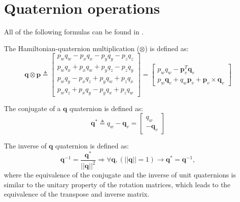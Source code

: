 \appendix
\chapter{Quaternion operations}\label{app:quaternion}

All of the following formulas can be found in \cite{quaternion-eskf}. 

The Hamiltonian-quaternion multiplication ($\otimes$) is defined as:
\begin{equation}
    \mathbf{q}\otimes\mathbf{p}\triangleq
    \begin{bmatrix}
        p_wq_w-p_xq_x-p_yq_y-p_zq_z \\
        p_wq_x+p_xq_w+p_yq_z-p_zq_y \\
        p_wq_y-p_xq_z+p_yq_w+p_zq_x \\
        p_wq_z+p_xq_y-p_yq_x+p_zq_w
    \end{bmatrix}=\begin{bmatrix}
        p_wq_w-\mathbf{p}_v^T\mathbf{q}_v \\
        p_w\mathbf{q}_v+q_w\mathbf{p}_v+\mathbf{p}_v\times\mathbf{q}_v
    \end{bmatrix}
    \label{eq:quaternion-product}
\end{equation}

The conjugate of a $\mathbf{q}$ quaternion is defined as:
\begin{equation}
    \mathbf{q}^*\triangleq q_w-\mathbf{q}_v=\begin{bmatrix}
        q_w \\ -\mathbf{q}_v
    \end{bmatrix}
\end{equation}

The inverse of $\mathbf{q}$ quaternion is defined as:
\begin{equation}
    \mathbf{q}^{-1}=\frac{\mathbf{q}^*}{||\mathbf{q}||^2}\Rightarrow\forall\mathbf{q},(||\mathbf{q}||=1)\rightarrow\mathbf{q}^*=\mathbf{q}^{-1},
\end{equation}
where the equivalence of the conjugate and the inverse of unit quaternions is similar to the unitary property of the rotation matrices, which leads to the equivalence of the transpose and inverse matrix.

